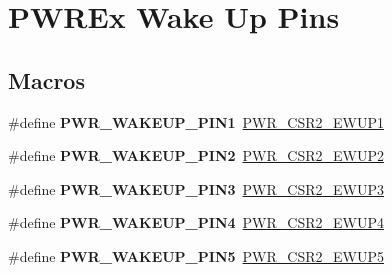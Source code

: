 \hypertarget{group___p_w_r_ex___wake_up___pins}{}\section{P\+W\+R\+Ex Wake Up Pins}
\label{group___p_w_r_ex___wake_up___pins}
\subsection*{Macros}
\begin{DoxyCompactItemize}
\item 
\mbox{\label{group___p_w_r_ex___wake_up___pins_ga0da8e7cbe0826e93b777ae4419a1cd05}} 
\#define {\bfseries P\+W\+R\+\_\+\+W\+A\+K\+E\+U\+P\+\_\+\+P\+I\+N1}~\mbox{\hyperlink{group___peripheral___registers___bits___definition_ga880b5a87187790660ad881a7d655d3c2}{P\+W\+R\+\_\+\+C\+S\+R2\+\_\+\+E\+W\+U\+P1}}
\item 
\mbox{\label{group___p_w_r_ex___wake_up___pins_ga0c718de5967a8d2cec63d0b5fe0b2ada}} 
\#define {\bfseries P\+W\+R\+\_\+\+W\+A\+K\+E\+U\+P\+\_\+\+P\+I\+N2}~\mbox{\hyperlink{group___peripheral___registers___bits___definition_gaff300e908d03514860d64564c8238071}{P\+W\+R\+\_\+\+C\+S\+R2\+\_\+\+E\+W\+U\+P2}}
\item 
\mbox{\label{group___p_w_r_ex___wake_up___pins_ga0cd92601d07cf7594716c22a0aa3ba26}} 
\#define {\bfseries P\+W\+R\+\_\+\+W\+A\+K\+E\+U\+P\+\_\+\+P\+I\+N3}~\mbox{\hyperlink{group___peripheral___registers___bits___definition_ga03a6c71dbb90a6d9686d26e6acdff7bb}{P\+W\+R\+\_\+\+C\+S\+R2\+\_\+\+E\+W\+U\+P3}}
\item 
\mbox{\label{group___p_w_r_ex___wake_up___pins_ga043f15e42e900b9609b0558f68ba4bb9}} 
\#define {\bfseries P\+W\+R\+\_\+\+W\+A\+K\+E\+U\+P\+\_\+\+P\+I\+N4}~\mbox{\hyperlink{group___peripheral___registers___bits___definition_ga75748b27a1d912938c41e41f1d08d01c}{P\+W\+R\+\_\+\+C\+S\+R2\+\_\+\+E\+W\+U\+P4}}
\item 
\mbox{\label{group___p_w_r_ex___wake_up___pins_gaef728b0a555c4f84d27367c34d993774}} 
\#define {\bfseries P\+W\+R\+\_\+\+W\+A\+K\+E\+U\+P\+\_\+\+P\+I\+N5}~\mbox{\hyperlink{group___peripheral___registers___bits___definition_ga69f8a9594c8cfd34d5c8329d64e55273}{P\+W\+R\+\_\+\+C\+S\+R2\+\_\+\+E\+W\+U\+P5}}

\end{DoxyCompactItemize}
